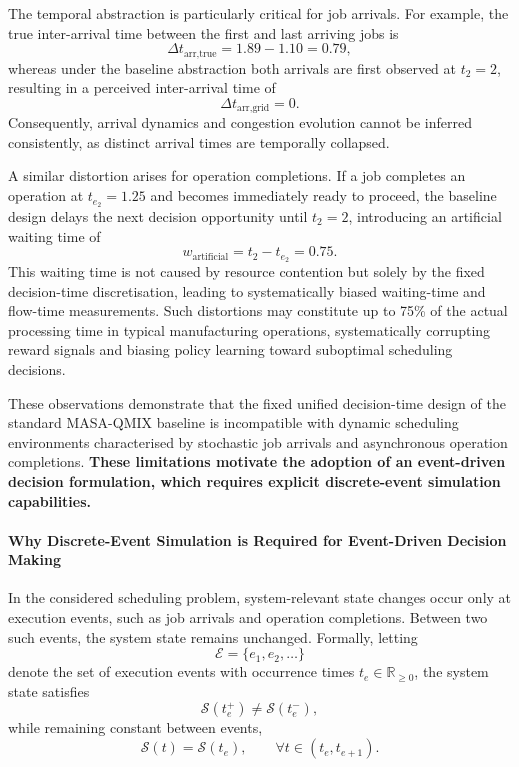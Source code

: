 The temporal abstraction is particularly critical for job arrivals. For example, the true inter-arrival time between the first and last arriving jobs is
\[
\Delta t_{\text{arr,true}} = 1.89 - 1.10 = 0.79,
\]
whereas under the baseline abstraction both arrivals are first observed at $t_2 = 2$, resulting in a perceived inter-arrival time of
\[
\Delta t_{\text{arr,grid}} = 0.
\]
Consequently, arrival dynamics and congestion evolution cannot be inferred consistently, as distinct arrival times are temporally collapsed.

A similar distortion arises for operation completions. If a job completes an operation at $t_{e_2} = 1.25$ and becomes immediately ready to proceed, the baseline design delays the next decision opportunity until $t_2 = 2$, introducing an artificial waiting time of
\[
w_{\text{artificial}} = t_2 - t_{e_2} = 0.75.
\]
This waiting time is not caused by resource contention but solely by the fixed decision-time discretisation, leading to systematically biased waiting-time and flow-time measurements. Such distortions may constitute up to 75\% of the actual processing time in typical manufacturing operations, systematically corrupting reward signals and biasing policy learning toward suboptimal scheduling decisions.

These observations demonstrate that the fixed unified decision-time design of the standard MASA-QMIX baseline is incompatible with dynamic scheduling environments characterised by stochastic job arrivals and asynchronous operation completions. \textbf{These limitations motivate the adoption of an event-driven decision formulation, which requires explicit discrete-event simulation capabilities.}

\paragraph{Why Discrete-Event Simulation is Required for Event-Driven Decision Making}

In the considered scheduling problem, system-relevant state changes occur only at execution events, such as job arrivals and operation completions. Between two such events, the system state remains unchanged. Formally, letting
\begin{equation}
\mathcal{E} = \{ e_1, e_2, \ldots \}
\label{eq:event_set}
\end{equation}
denote the set of execution events with occurrence times $t_e \in \mathbb{R}_{\ge 0}$, the system state satisfies
\begin{equation}
\mathcal{S}(t_e^+) \neq \mathcal{S}(t_e^-),
\label{eq:state_jump_at_event}
\end{equation}
while remaining constant between events,
\begin{equation}
\mathcal{S}(t) = \mathcal{S}(t_e), 
\qquad \forall t \in (t_e, t_{e+1}).
\label{eq:state_constant_between_events}
\end{equation}

